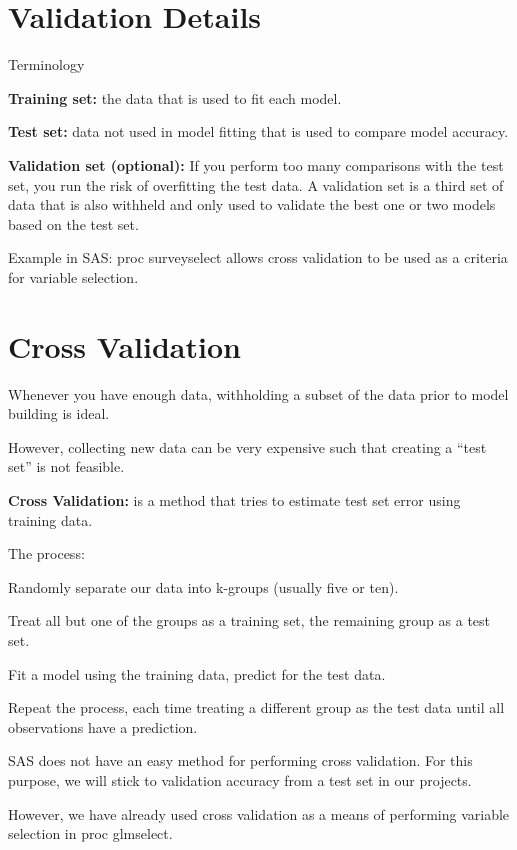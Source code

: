 \documentclass[12pt]{notes}
\begin{document}
\section{Validation Details}
Terminology
\bi
\item \textbf{Training set:} the data that is used to fit each model. 
\item \textbf{Test set:} data not used in model fitting that is used to compare model accuracy. 
\item \textbf{Validation set (optional):} If you perform too many comparisons with the test set, you run the risk of overfitting the test data. A validation set is a third set of data that is also withheld and only used to validate the best one or two models based on the test set. 
\ei

Example in SAS: proc surveyselect allows cross validation to be used as a criteria for variable selection. 

\section{Cross Validation}
Whenever you have enough data, withholding a subset of the data prior to model building is ideal. 

\nspace
However, collecting new data can be very expensive such that creating a ``test set'' is not feasible. 

\textbf{Cross Validation:} is a method that tries to estimate test set error using training data. 

\nspace The process:
\bi 
\item Randomly separate our data into k-groups (usually five or ten). 
\item Treat all but one of the groups as a training set, the remaining group as a test set. 
\item Fit a model using the training data, predict for the test data. 
\item Repeat the process, each time treating a different group as the test data until all observations have a prediction. 
\ei

\nspace
SAS does not have an easy method for performing cross validation. For this purpose, we will stick to validation accuracy from a test set in our projects. 

\nspace
However, we have already used cross validation as a means of performing variable selection in proc glmselect. 
\end{document}
